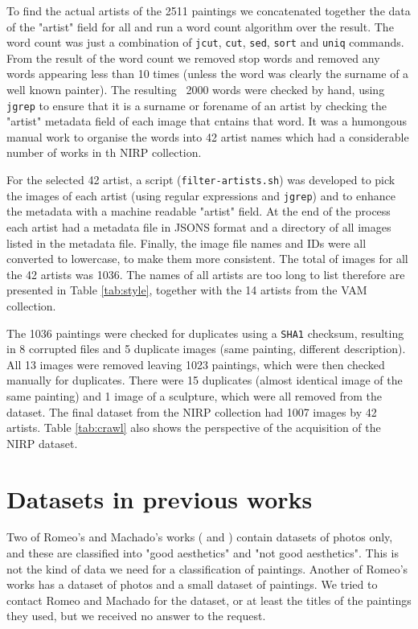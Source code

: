 \documentclass[11pt,a4paper,draft]{report}
\begin{document}
\begin{multicols}{2}
To find the actual artists of the 2511 paintings we concatenated together the
data of the "artist" field for all and run a word count algorithm over the
result.  The word count was just a combination of \texttt{jcut}, \texttt{cut},
\texttt{sed}, \texttt{sort} and \texttt{uniq} commands.  From the result of the
word count we removed stop words and removed any words appearing less than 10
times (unless the word was clearly the surname of a well known painter).  The
resulting ~2000 words were checked by hand, using \texttt{jgrep} to ensure that
it is a surname or forename of an artist by checking the "artist" metadata
field of each image that cntains that word.  It was a humongous manual work to
organise the words into 42 artist names which had a considerable number of
works in th NIRP collection.

For the selected 42 artist, a script (\texttt{filter-artists.sh}) was developed
to pick the images of each artist (using regular expressions and
\texttt{jgrep}) and to enhance the metadata with a machine readable "artist"
field.  At the end of the process each artist had a metadata file in JSONS
format and a directory of all images listed in the metadata file.  Finally, the
image file names and IDs were all converted to lowercase, to make them more
consistent.  The total of images for all the 42 artists was 1036.  The names of
all artists are too long to list therefore are presented in Table
\ref{tab:style}, together with the 14 artists from the VAM collection.

The 1036 paintings were checked for duplicates using a \texttt{SHA1} checksum,
resulting in 8 corrupted files and 5 duplicate images (same painting, different
description).  All 13 images were removed leaving 1023 paintings, which were
then checked manually for duplicates.  There were 15 duplicates (almost
identical image of the same painting) and 1 image of a sculpture, which were
all removed from the dataset.  The final dataset from the NIRP collection had
1007 images by 42 artists.  Table \ref{tab:crawl} also shows the perspective of
the acquisition of the NIRP dataset.

\section{Datasets in previous works}

Two of Romeo's and Machado's works (\cite{jma12clas} and \cite{cmrc13fs})
contain datasets of photos only, and these are classified into "good
aesthetics" and "not good aesthetics".  This is not the kind of data we need
for a classification of paintings.  Another of Romeo's works \cite{rmc12ajs}
has a dataset of photos and a small dataset of paintings.  We tried to contact
Romeo and Machado for the dataset, or at least the titles of the paintings they
used, but we received no answer to the request.


\end{multicols}
\end{document}
